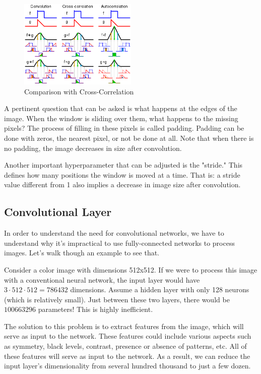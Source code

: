 \begin{figure}[h!]
    \centering
    \includegraphics[width=0.5\textwidth]{figuras/cross-correlation.png}
    \caption{Comparison with Cross-Correlation}
\end{figure}

A pertinent question that can be asked is what happens at the edges of the image. When the window is sliding over them, what happens to the missing pixels? The process of filling in these pixels is called padding. Padding can be done with zeros, the nearest pixel, or not be done at all. Note that when there is no padding, the image decreases in size after convolution.

Another important hyperparameter that can be adjusted is the "stride." This defines how many positions the window is moved at a time. That is: a stride value different from 1 also implies a decrease in image size after convolution.

\subsection{Convolutional Layer}

In order to understand the need for convolutional networks, we have to understand why it's impractical to use fully-connected networks to process images. Let's walk though an example to see that. 

Consider a color image with dimensions 512x512. If we were to process this image with a conventional neural network, the input layer would have \( 3 \cdot 512 \cdot 512 = 786432 \) dimensions. Assume a hidden layer with only 128 neurons (which is relatively small). Just between these two layers, there would be \( 100663296 \) parameters! This is highly inefficient.

The solution to this problem is to extract features from the image, which will serve as input to the network. These features could include various aspects such as symmetry, black levels, contrast, presence or absence of patterns, etc. All of these features will serve as input to the network. As a result, we can reduce the input layer's dimensionality from several hundred thousand to just a few dozen.


